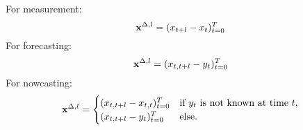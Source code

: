 For measurement:
\begin{equation}
    \mathbf{x}^{\Delta,l} = (x_{t+l} -x_{t})^T_{t=0} \label{eq:diffxl_measure}
\end{equation}
For forecasting:
\begin{equation}
    \mathbf{x}^{\Delta,l} = (x_{t,t+l} -y_{t})^T_{t=0} \label{eq:diffxl_forecasting}
\end{equation}
For nowcasting:
\begin{equation}
\mathbf{x}^{\Delta,l} = 
\begin{cases} 
(x_{t,t+l} -x_{t,t})^T_{t=0} & \text{if } y_{t} \text{ is not known at time } t, \\
(x_{t,t+l} -y_{t})^T_{t=0}  & \text{else}.
\end{cases} \label{eq:diffxl_nowcasting}
\end{equation}











